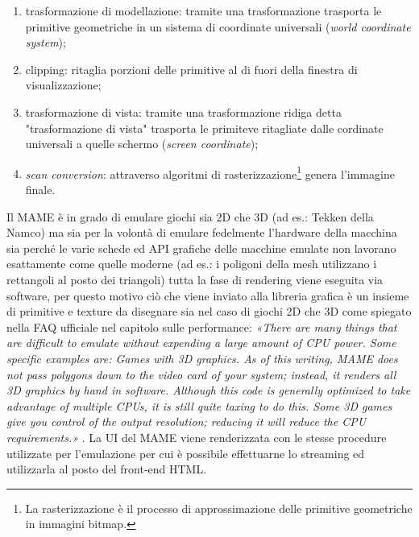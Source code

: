 \begin{enumerate}
    \item trasformazione di modellazione: tramite una trasformazione trasporta le primitive geometriche in un sistema di coordinate universali (\textit{world coordinate system});
    \item clipping: ritaglia porzioni delle primitive al di fuori della finestra di visualizzazione;
    \item trasformazione di vista: tramite una trasformazione ridiga detta "trasformazione di vista" trasporta le primiteve ritagliate dalle cordinate universali a quelle schermo (\textit{screen coordinate});
    \item \textit{scan conversion}: attraverso algoritmi di rasterizzazione\footnote{La rasterizzazione è il processo di approssimazione delle primitive geometriche in immagini bitmap.} genera l'immagine finale.
\end{enumerate}

Il MAME è in grado di emulare giochi sia 2D che 3D (ad es.: Tekken della Namco) ma sia per la volontà di emulare fedelmente l'hardware della macchina sia perché le varie schede ed API grafiche delle macchine emulate non lavorano esattamente come quelle moderne (ad es.: i poligoni della mesh utilizzano i rettangoli al posto dei triangoli) tutta la fase di rendering viene eseguita via software, per questo motivo ciò che viene inviato alla libreria grafica è un insieme di primitive e texture da disegnare sia nel caso di giochi 2D che 3D come spiegato nella FAQ ufficiale nel capitolo sulle performance: \textit{«There are many things that are difficult to emulate without expending a large amount of CPU power. Some specific examples are: Games with 3D graphics. As of this writing, MAME does not pass polygons down to the video card of your system; instead, it renders all 3D graphics by hand in software. Although this code is generally optimized to take advantage of multiple CPUs, it is still quite taxing to do this. Some 3D games give you control of the output resolution; reducing it will reduce the CPU requirements.»} \parencite{MAME_FAQ_Performance}. La UI del MAME viene renderizzata con le stesse procedure utilizzate per l'emulazione per cui è possibile effettuarne lo streaming ed utilizzarla al posto del front-end HTML.

